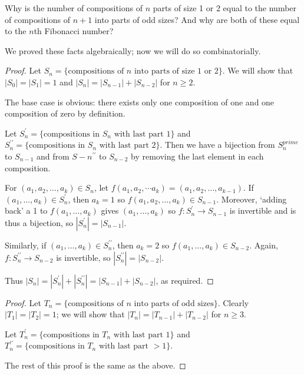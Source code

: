 \documentclass[12pt]{article}
\begin{document}
\begin{example}
Why is the number of compositions of $n$ parts of size 1 or 2 equal to the number of compositions of $n+1$ into parts of odd sizes? And why are both of these equal to the $n$th Fibonacci number?

We proved these facts algebraically; now we will do so combinatorially.

\begin{proof}
Let $S_n = \{\text{compositions of }n\text{ into parts of size 1 or 2}\}$. We will show that $|S_0| = |S_1| = 1$ and $|S_n| = |S_{n-1}| + |S_{n-2}|$ for $n\geq 2$.

The base case is obvious: there exists only one composition of one and one composition of zero by definition.

Let $S_n^\prime = \{\text{compositions in }S_n\text{ with last part }1\}$ and $S_n^{\prime\prime} = \{\text{compositions in }S_n\text{ with last part }2\}$. Then we have a bijection from $S_n^{prime}$ to $S_{n-1}$ and from $S-n^{\prime\prime}$ to $S_{n-2}$ by removing the last element in each composition.

For $(a_1, a_2, \ldots, a_k) \in S_n$, let $f(a_1, a_2, \cdots a_k) = (a_1, a_2, \ldots, a_{k-1})$. If $(a_1, \ldots, a_k) \in S_n^\prime$, then $a_k = 1$ so $f(a_1, a_2, \ldots, a_k) \in S_{n-1}$. Moreover, `adding back' a 1 to $f(a_1, \ldots, a_k)$ gives $(a_1, \ldots, a_k)$ so $f: S_n^\prime \to S_{n-1}$ is invertible and is thus a bijection, so $|S_n^\prime| = |S_{n-1}|$.

Similarly, if $(a_1, \ldots, a_k) \in S_n^{\prime\prime}$, then $a_k = 2$ so $f(a_1, \ldots, a_k) \in S_{n-2}$. Again, $f: S_n^{\prime\prime} \to S_{n-2}$ is invertible, so $|S_n^{\prime\prime}| = |S_{n-2}|$.

Thus $|S_n| = |S_n^\prime| + |S_n^{\prime\prime}| = |S_{n-1}| + |S_{n-2}|$, as required.
\end{proof}

\begin{proof}
Let $T_n = \{\text{compositions of }n\text{ into parts of odd sizes}\}$. Clearly $|T_1| = |T_2| = 1$; we will show that $|T_n| = |T_{n-1}| + |T_{n-2}|$ for $n\geq 3$.

Let $T_n^\prime = \{\text{compositions in }T_n\text{ with last part }1\}$ and $T_n^{\prime\prime} = \{\text{compositions in }T_n\text{ with last part }>1\}$.

The rest of this proof is the same as the above.
\end{proof}
\end{example}
\end{document}
